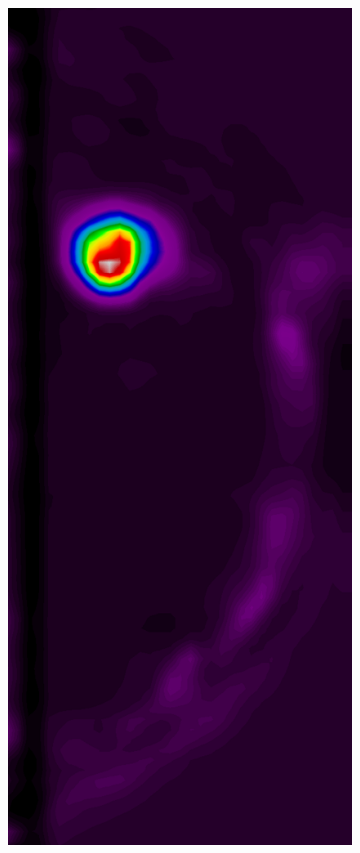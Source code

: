 \documentclass{beamer}
\begin{document}
\begin{frame}
\begin{figure}
\begin{subfigure}{0.134\textwidth}
            \end{subfigure}
            \begin{subfigure}{0.134\textwidth}
	            \centering
		            \includegraphics[width=\textwidth]{plots/examples/example2_probs_2.png}

\end{subfigure}
\end{figure}
\end{frame}
\end{document}
